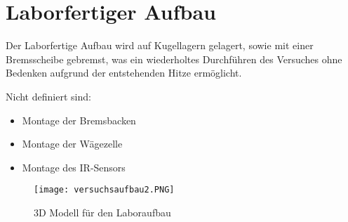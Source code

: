 \section{Laborfertiger Aufbau}

Der Laborfertige Aufbau wird auf Kugellagern gelagert, sowie mit einer Bremsscheibe gebremst, was ein wiederholtes Durchführen des Versuches ohne Bedenken aufgrund der entstehenden Hitze ermöglicht.

Nicht definiert sind:

\begin{itemize}
    \item Montage der Bremsbacken
    \item Montage der Wägezelle
    \item Montage des IR-Sensors
\end{itemize}

\begin{figure}[H]
    \begin{center}
        \texttt{[image: versuchsaufbau2.PNG]}
        \caption{3D Modell für den Laboraufbau}
    \end{center}
\end{figure}